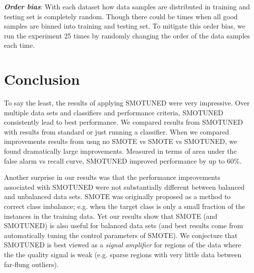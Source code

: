 \documentclass[10pt,conference]{IEEEtran}
\theoremstyle{break}
\theoremstyle{break}
\newcommand{\tion}[1]{{\S}\ref{sect:#1}}
\newcommand{\sma}{{\sc SMOTE}}
\newcommand{\smb}{{\sc SMOTUNED}}
\begin{document}

\textbf{\textit{Order bias}}: With each dataset how data samples are distributed in training and testing set is completely random. Though there could be times when all good samples are binned into training and testing set. To mitigate this order bias, we run
the experiment 25 times by randomly changing the order of the data samples each time.

\section{Conclusion}
\label{sect:conclusion}

To say the least, the results of applying {\smb}  were very impressive.
Over multiple data sets and  classifiers and performance  criteria,  {\smb} consistently
lead to best performance. We compared results from {\smb} with results  from standard or just running a classifier. When we compared improvements
results from usng no SMOTE vs SMOTE vs {\smb}, we found dramatically large improvements.
Measured in terms
of area under the false alarm vs recall curve, {\smb} improved performance by up to 60\%.

Another surprise in our results was that the performance improvements associated with {\smb} were not substantially different between balanced and unbalanced data sets.
 {\sma} was originally proposed as a method to correct class imbalance; e.g. when the target class is only a small fraction of the instances in the training data.
 Yet our results show that SMOTE (and SMOTUNED) is also useful for balanced data sets (and best results come from automatically tuning the control parameters of SMOTE). We conjecture that SMOTUNED
is best viewed as a   {\em signal amplifier} for regions of the data where the the quality signal is weak  (e.g. sparse regions with very little data between far-flung outliers). 
\end{document}
